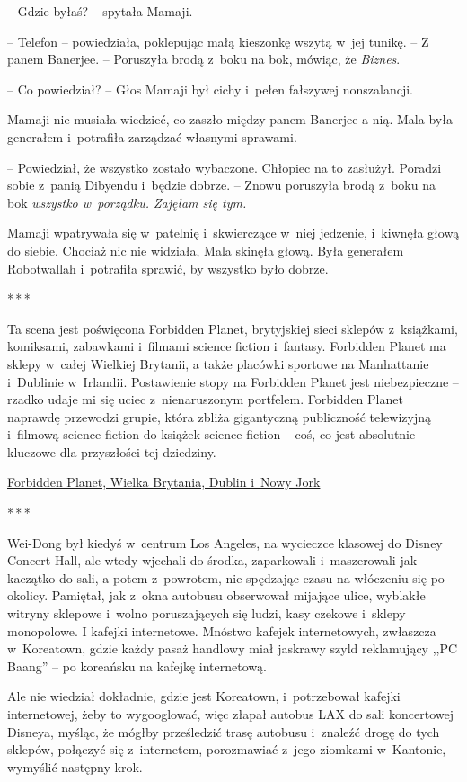 \documentclass[oneside,polish,11pt,rmheadings]{mwbk}
\newcommand{\threeast}{\par\centerline{*\,*\,*}\medskip\par}
\begin{document}
-- Gdzie byłaś? -- spytała Mamaji. 


-- Telefon -- powiedziała, poklepując małą kieszonkę wszytą w~jej tunikę. -- Z panem Banerjee. -- Poruszyła brodą z~boku na bok, mówiąc, że \textit{Biznes}. 


-- Co powiedział? -- Głos Mamaji był cichy i~pełen fałszywej nonszalancji. 


Mamaji nie musiała wiedzieć, co zaszło między panem Banerjee a nią. Mala była generałem i~potrafiła zarządzać własnymi sprawami. 


-- Powiedział, że wszystko zostało wybaczone. Chłopiec na to zasłużył. Poradzi sobie z~panią Dibyendu i~będzie dobrze. -- Znowu poruszyła brodą z~boku na bok \textit{wszystko w~porządku. Zajęłam się tym.} 


Mamaji wpatrywała się w~patelnię i~skwierczące w~niej jedzenie, i~kiwnęła głową do siebie. Chociaż nic nie widziała, Mala skinęła głową. Była generałem Robotwallah i~potrafiła sprawić, by wszystko było dobrze. 

\bigskip
\threeast

Ta scena jest poświęcona Forbidden Planet, brytyjskiej sieci sklepów z~książkami, komiksami, zabawkami i~filmami science fiction i~fantasy. Forbidden Planet ma sklepy w~całej Wielkiej Brytanii, a także placówki sportowe na Manhattanie i~Dublinie w~Irlandii. Postawienie stopy na Forbidden Planet jest niebezpieczne -- rzadko udaje mi się uciec z~nienaruszonym portfelem. Forbidden Planet naprawdę przewodzi grupie, która zbliża gigantyczną publiczność telewizyjną i~filmową science fiction do książek science fiction -- coś, co jest absolutnie kluczowe dla przyszłości tej dziedziny. 


\href{https://forbiddenplanet.co.uk/}{Forbidden Planet, Wielka Brytania, Dublin i~Nowy Jork} 

\bigskip
\threeast

Wei-Dong był kiedyś w~centrum Los Angeles, na wycieczce klasowej do Disney Concert Hall, ale wtedy wjechali do środka, zaparkowali i~maszerowali jak kaczątko do sali, a potem z~powrotem, nie spędzając czasu na włóczeniu się po okolicy. Pamiętał, jak z~okna autobusu obserwował mijające ulice, wyblakłe witryny sklepowe i~wolno poruszających się ludzi, kasy czekowe i~sklepy monopolowe. I kafejki internetowe. Mnóstwo kafejek internetowych, zwłaszcza w~Koreatown, gdzie każdy pasaż handlowy miał jaskrawy szyld reklamujący ,,PC Baang'' -- po koreańsku na kafejkę internetową. 


Ale nie wiedział dokładnie, gdzie jest Koreatown, i~potrzebował kafejki internetowej, żeby to wygooglować, więc złapał autobus LAX do sali koncertowej Disneya, myśląc, że mógłby prześledzić trasę autobusu i~znaleźć drogę do tych sklepów, połączyć się z~internetem, porozmawiać z~jego ziomkami w~Kantonie, wymyślić następny krok. 
\end{document}
